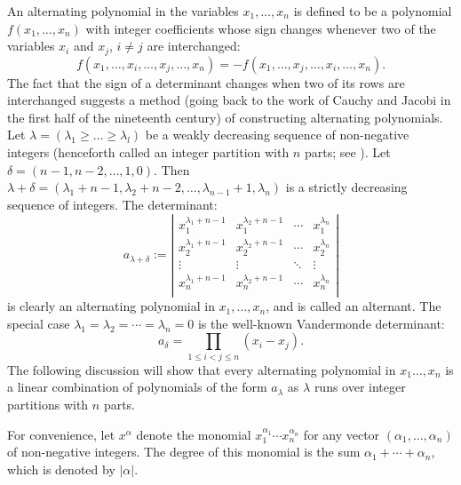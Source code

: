 \documentclass{amsart}
\theoremstyle{plain}
\theoremstyle{definition}
\theoremstyle{remark}
\begin{document}
An alternating polynomial in the variables $x_1,\dotsc,x_n$ is defined to be a polynomial $f(x_1,\dotsc,x_n)$ with integer coefficients whose sign changes whenever two of the variables $x_i$ and $x_j$, $i\neq j$ are interchanged:
\begin{displaymath}
  f(x_1,\dotsc,x_i,\dotsc,x_j,\dotsc,x_n) = -f(x_1,\dotsc,x_j,\dotsc, x_i,\dotsc, x_n).
\end{displaymath}
The fact that the sign of a determinant changes when two of its rows are interchanged suggests a method (going back to the work of Cauchy and Jacobi in the first half of the nineteenth century) of constructing alternating polynomials.
Let $\lambda=(\lambda_1\geq \dotsc \geq\lambda_l)$ be a weakly decreasing sequence of non-negative integers (henceforth called an integer partition with $n$ parts; see \cite{andrews}).
Let $\delta=(n-1,n-2,\dotsc,1,0)$.
Then $\lambda+\delta=(\lambda_1+n-1,\lambda_2+n-2,\dotsc,\lambda_{n-1}+1,\lambda_n)$ is a strictly decreasing sequence of integers.
The determinant:
\begin{displaymath}
  a_{\lambda+\delta} := \left|
    \begin{matrix}
      x_1^{\lambda_1+n-1} & x_1^{\lambda_2+n-1} & \dotsb & x_1^{\lambda_n}\\
      x_2^{\lambda_1+n-1} & x_2^{\lambda_2+n-1} & \dotsb & x_2^{\lambda_n}\\
      \vdots & \vdots & \ddots & \vdots\\
      x_n^{\lambda_1+n-1} & x_n^{\lambda_2+n-1} & \dotsb & x_n^{\lambda_n}\\
    \end{matrix}
    \right|
\end{displaymath}
is clearly an alternating polynomial in $x_1,\dotsc,x_n$, and is called an alternant.
The special case $\lambda_1=\lambda_2=\dotsb=\lambda_n=0$ is the well-known Vandermonde determinant:
\begin{equation}
  \label{eq:vandermonde}
  a_\delta = \prod_{1\leq i<j\leq n}(x_i-x_j).
\end{equation}
The following discussion will show that every alternating polynomial in $x_1\dotsc,x_n$ is a linear combination of polynomials of the form $a_\lambda$ as $\lambda$ runs over integer partitions with $n$ parts.

For convenience, let $x^\alpha$ denote the monomial $x_1^{\alpha_1}\dotsb x_n^{\alpha_n}$ for any vector $(\alpha_1,\dotsc,\alpha_n)$ of non-negative integers.
The degree of this monomial is the sum $\alpha_1+\dotsb+\alpha_n$, which is denoted by $|\alpha|$.
\end{document}
